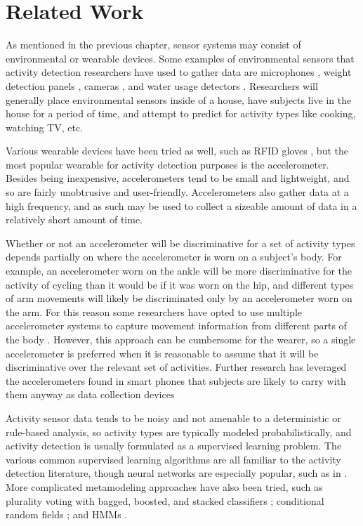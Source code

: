 \chapter{Related Work}
As mentioned in the previous chapter, sensor systems may consist
of environmental or wearable devices. Some examples of environmental
sensors that activity detection researchers have used to
gather data are microphones \cite{fogarty06}, weight detection
panels \cite{rowan05}, cameras \cite{duong05}, and water usage detectors
\cite{fogarty06}. Researchers will generally place environmental sensors
inside of a house, have subjects live in the house for a period of time, and
attempt to predict for activity types like cooking, watching TV, etc.

Various wearable devices have been tried as well, such as RFID gloves
\cite{gu09} \cite{rowan05}, but the most popular wearable for activity detection
purposes is the accelerometer. Besides being inexpensive, accelerometers
tend to be small and lightweight, and so are fairly unobtrusive and
user-friendly. Accelerometers also gather data at a high frequency, and as such
may be used to collect a sizeable amount of data in a relatively short amount
of time.

Whether or not an accelerometer will be discriminative for a
set of activity types depends partially on where the accelerometer is worn on
a subject's body. For example, an accelerometer worn on the ankle will be
more discriminative for the activity of cycling than it would be if it was worn
on the hip, and different types of arm movements will likely be
discriminated only by an accelerometer worn on the arm. For this reason some
researchers have opted to use multiple accelerometer systems to capture
movement information from different parts of the body \cite{bao04}
\cite{devries11}. However, this approach can be cumbersome for the wearer, so a
single accelerometer is preferred when it is reasonable to assume that it will
be discriminative over the relevant set of activities. Further research has
leveraged the accelerometers found in smart phones that subjects
are likely to carry with them anyway as data collection devices
\cite{bao04} \cite{choudhury08} \cite{kwapitz10}

Activity sensor data tends to be noisy and not amenable to a
deterministic or rule-based analysis, so activity types are typically modeled
probabilistically, and activity detection is usually formulated as a supervised
learning problem. The various common supervised learning algorithms are all
familiar to the activity detection literature, though neural networks are
especially popular, such as in \cite{aminian95} \cite{song07} \cite{staudenmeyer09}.
More complicated metamodeling approaches have also been tried, such as
plurality voting with bagged, boosted, and stacked classifiers \cite{ravi05};
conditional random fields \cite{blanke10} \cite{gu09} \cite{vankasteren08} \cite{wu09}; and HMMs
\cite{gu09} \cite{lester05} \cite{pober06} \cite{wu09}.

